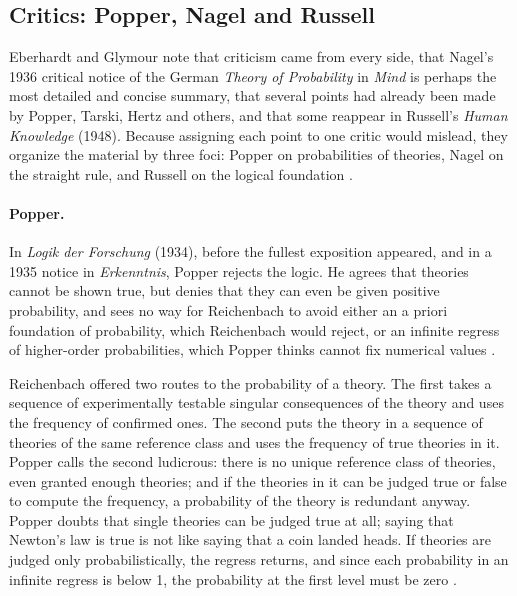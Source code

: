 \subsection{Critics: Popper, Nagel and Russell}
\label{sec:p15-w02b-p15-030-eg-critics}

Eberhardt and Glymour note that criticism came from every side, that Nagel's 1936
critical notice of the German \emph{Theory of Probability} in \emph{Mind} is
perhaps the most detailed and concise summary, that several points had
already been made by Popper, Tarski, Hertz and others, and that some
reappear in Russell's \emph{Human Knowledge} (1948). Because assigning
each point to one critic would mislead, they organize the material by
three foci: Popper on probabilities of theories, Nagel on the straight
rule, and Russell on the logical foundation
\cite[p.~377]{EberhardtGlymour2011ReichenbachReading}.

\paragraph{Popper.} In \emph{Logik der Forschung} (1934), before the
fullest exposition appeared, and in a 1935 notice in \emph{Erkenntnis},
Popper rejects the logic. He agrees that theories cannot be shown true,
but denies that they can even be given positive probability, and sees no
way for Reichenbach to avoid either an a priori foundation of
probability, which Reichenbach would reject, or an infinite regress of
higher-order probabilities, which Popper thinks cannot fix numerical
values \cite[p.~377]{EberhardtGlymour2011ReichenbachReading}.

Reichenbach offered two routes to the probability of a theory. The
first takes a sequence of experimentally testable singular consequences
of the theory and uses the frequency of confirmed ones. The second puts
the theory in a sequence of theories of the same reference class and uses
the frequency of true theories in it. Popper calls the second ludicrous:
there is no unique reference class of theories, even granted enough
theories; and if the theories in it can be judged true or false to
compute the frequency, a probability of the theory is redundant anyway.
Popper doubts that single theories can be judged true at all; saying
that Newton's law is true is not like saying that a coin landed heads.
If theories are judged only probabilistically, the regress returns, and
since each probability in an infinite regress is below 1, the
probability at the first level must be zero
\cite[pp.~377--378]{EberhardtGlymour2011ReichenbachReading}.

